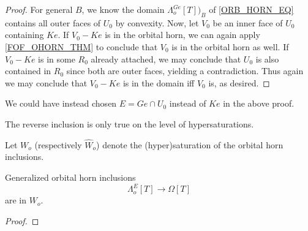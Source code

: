 \documentclass[a4paper,10pt,draft]{article}%
\begin{document}
{\begin{proof}
      For general $B$, we know the domain $\Lambda^{G e}_o[T])_B$ of \eqref{ORB_HORN_EQ}
      contains all outer faces of $U_0$ by convexity.
      Now, let $V_0$ be an inner face of $U_0$ containing $K e$.
      If $V_0 - K e$ is in the orbital horn,
      we can again apply \cref{FOF_OHORN_THM} to conclude that $V_0$ is in the orbital horn as well.
      If $V_0 - K e$ is in some $R_0$ already attached,
      we may conclude that $U_0$ is also contained in $R_0$ since both are outer faces, yielding a contradiction.
      Thus again we may conclude that $V_0 - K e$ is in the domain iff $V_0$ is, as desired.
\end{proof}

\begin{remark}
      We could have instead chosen $E = G e \cap U_0$ instead of $K e$ in the above proof.
\end{remark}

 }%




The reverse inclusion is only true on the level of hypersaturations.
\begin{definition}
      Let $W_o$ (respectively $\hat{W}_o$) denote the (hyper)saturation of the orbital horn inclusions.
\end{definition}

\begin{lemma}
      \label{GORB_OHORN_THM}
      Generalized orbital horn inclusions
      \begin{equation}
            \Lambda^{E}_o[T] \to \Omega[T]
      \end{equation}
      are in $W_o$.
\end{lemma}
\begin{proof}
\end{proof}
\end{document}
